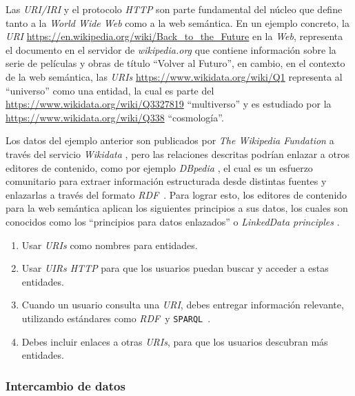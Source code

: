 \documentclass[conference,compsoc]{IEEEtran}
\newcommand{\rdf}{\textit{RDF}\ } \newcommand{\spql}{\texttt{SPARQL}\ }
\begin{document}
Las \textit{URI/IRI} y el protocolo \textit{HTTP} son parte fundamental del
núcleo que define tanto a la \textit{World Wide Web} como a la web semántica. En
un ejemplo concreto, la \textit{URI}
\url{https://en.wikipedia.org/wiki/Back_to_the_Future} en la \textit{Web},
representa el documento en el servidor de \textit{wikipedia.org} que contiene
información sobre la serie de películas y obras de título ``Volver al Futuro'',
en cambio, en el contexto de la web semántica, las \textit{URIs}
\url{https://www.wikidata.org/wiki/Q1} representa al ``universo'' como una
entidad, la cual es parte del \url{https://www.wikidata.org/wiki/Q3327819}
``multiverso'' y es estudiado por la \url{https://www.wikidata.org/wiki/Q338}
``cosmología''.

Los datos del ejemplo anterior son publicados por \textit{The Wikipedia
Fundation} a través del servicio \textit{Wikidata}
\cite{vrandevcic2014wikidata}, pero las relaciones descritas podrían enlazar a
otros editores de contenido, como por ejemplo \textit{DBpedia}
\cite{valsecchi2015dbpedia}, el cual es un esfuerzo comunitario para extraer
información estructurada desde distintas fuentes y enlazarlas a través del
formato \rdf. Para lograr esto, los editores de contenido para la web semántica
aplican los siguientes principios a sus datos, los cuales son conocidos como los
``principios para datos enlazados'' o \textit{LinkedData principles}
\cite{bizer2011linked}.

\begin{enumerate}
    \item Usar \textit{URIs} como nombres para entidades.
    \item Usar \textit{UIRs HTTP} para que los usuarios puedan buscar y acceder
    a estas entidades.
    \item Cuando un usuario consulta una \textit{URI}, debes entregar
    información relevante, utilizando estándares como \rdf y \spql.
    \item Debes incluir enlaces a otras \textit{URIs}, para que los usuarios
    descubran más entidades.
\end{enumerate}

    \subsubsection{Intercambio de datos}
\end{document}
